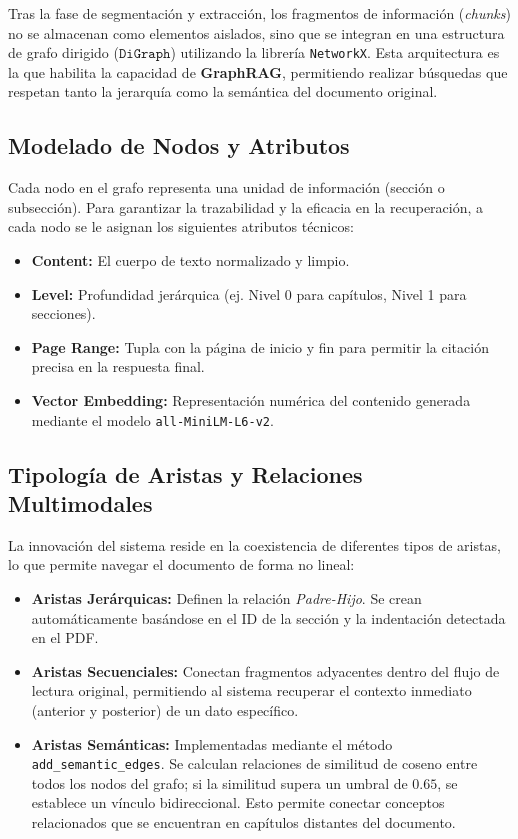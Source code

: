 Tras la fase de segmentación y extracción, los fragmentos de información (\textit{chunks}) no se almacenan como elementos aislados, sino que se integran en una estructura de grafo dirigido ($\texttt{DiGraph}$) utilizando la librería \texttt{NetworkX}. Esta arquitectura es la que habilita la capacidad de \textbf{GraphRAG}, permitiendo realizar búsquedas que respetan tanto la jerarquía como la semántica del documento original.

\subsection{Modelado de Nodos y Atributos}
Cada nodo en el grafo representa una unidad de información (sección o subsección). Para garantizar la trazabilidad y la eficacia en la recuperación, a cada nodo se le asignan los siguientes atributos técnicos:
\begin{itemize}
    \item \textbf{Content:} El cuerpo de texto normalizado y limpio.
    \item \textbf{Level:} Profundidad jerárquica (ej. Nivel 0 para capítulos, Nivel 1 para secciones).
    \item \textbf{Page Range:} Tupla con la página de inicio y fin para permitir la citación precisa en la respuesta final.
    \item \textbf{Vector Embedding:} Representación numérica del contenido generada mediante el modelo \texttt{all-\allowbreak MiniLM-\allowbreak L6-v2}.
\end{itemize}

\subsection{Tipología de Aristas y Relaciones Multimodales}
La innovación del sistema reside en la coexistencia de diferentes tipos de aristas, lo que permite navegar el documento de forma no lineal:
\begin{itemize}
    \item \textbf{Aristas Jerárquicas:} Definen la relación \textit{Padre-Hijo}. Se crean automáticamente basándose en el ID de la sección y la indentación detectada en el PDF.
    \item \textbf{Aristas Secuenciales:} Conectan fragmentos adyacentes dentro del flujo de lectura original, permitiendo al sistema recuperar el contexto inmediato (anterior y posterior) de un dato específico.
    \item \textbf{Aristas Semánticas:} Implementadas mediante el método \texttt{add\_semantic\_edges}. Se calculan relaciones de similitud de coseno entre todos los nodos del grafo; si la similitud supera un umbral de $0.65$, se establece un vínculo bidireccional. Esto permite conectar conceptos relacionados que se encuentran en capítulos distantes del documento.
\end{itemize}

